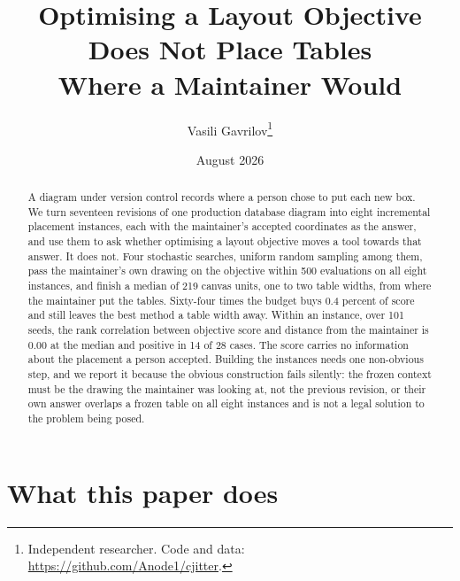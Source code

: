 \documentclass[11pt]{article}
\title{\textbf{Optimising a Layout Objective Does Not Place Tables\\
Where a Maintainer Would}}
\author{Vasili Gavrilov\thanks{Independent researcher. Code and data:
\url{https://github.com/Anode1/cjitter}.}}
\date{August 2026}
\begin{document}
\maketitle

\begin{center}\end{center}

\begin{abstract}
A diagram under version control records where a person chose to put each new box. We turn
seventeen revisions of one production database diagram into eight incremental placement
instances, each with the maintainer's accepted coordinates as the answer, and use them to ask
whether optimising a layout objective moves a tool towards that answer. It does not. Four
stochastic searches, uniform random sampling among them, pass the maintainer's own drawing on
the objective within 500 evaluations on all eight instances, and finish a median of 219 canvas
units, one to two table widths, from where the maintainer put the tables. Sixty-four times the
budget buys 0.4 percent of score and still leaves the best method a table width away. Within an instance, over 101 seeds, the rank
correlation between objective score and distance from the maintainer is $0.00$ at the median and
positive in 14 of 28 cases. The score carries no information about the placement a person
accepted. Building the instances needs one non-obvious step, and we report it because the
obvious construction fails silently: the frozen context must be the drawing the maintainer was
looking at, not the previous revision, or their own answer overlaps a frozen table on all eight
instances and is not a legal solution to the problem being posed.
\end{abstract}

\section{What this paper does}
\end{document}

